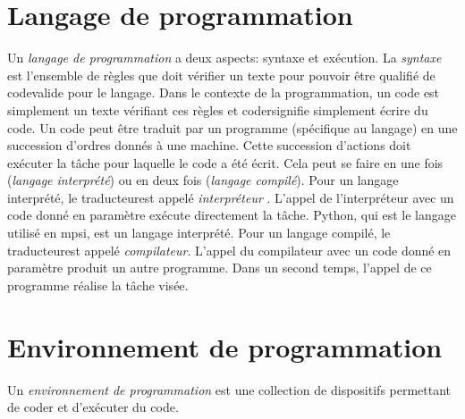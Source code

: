 
\usepackage{parcolumns}
\setlength{\parindent}{0pt}
\makeindex




\section{Langage de programmation}
Un \emph{langage de programmation} a deux aspects: syntaxe et exécution.\newline
La \emph{syntaxe} est l'ensemble de règles que doit vérifier un texte pour pouvoir être qualifié de \og code\fg valide pour le langage. Dans le contexte de la programmation, un code est simplement un texte vérifiant ces règles et \og coder\fg signifie simplement écrire du code.\newline
Un code peut être traduit par un programme (spécifique au langage) en une succession d'ordres donnés à une machine. Cette succession d'actions doit exécuter la tâche pour laquelle le code a été écrit. Cela peut se faire en une fois (\emph{langage interprété}) ou en deux fois (\emph{langage compilé}).  \newline
Pour un langage interprété, le \og traducteur\fg est appelé \emph{interpréteur} . L'appel de l'interpréteur avec un code donné en paramètre exécute directement la tâche. Python, qui est le langage utilisé en mpsi, est un langage interprété.\newline
Pour un langage compilé, le \og traducteur\fg est appelé \emph{compilateur}.  L'appel du compilateur avec un code donné en paramètre produit un autre programme. Dans un second temps, l'appel de ce programme réalise la tâche visée.\newline

\section{Environnement de programmation}
Un \emph{environnement de programmation}  est une collection de dispositifs permettant de coder et d'exécuter du code.
